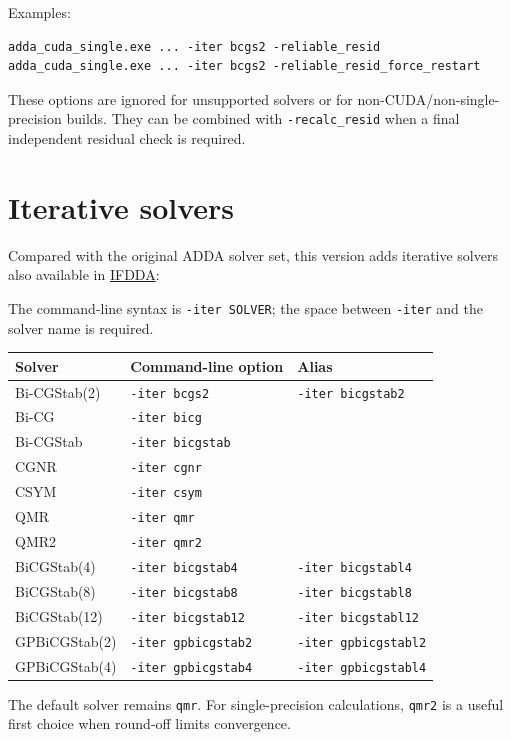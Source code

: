 \documentclass[11pt,a4paper]{article}
\newcommand{\code}[1]{\nolinkurl{#1}}
\newcommand{\itercmd}[1]{\texttt{-iter #1}}
\begin{document}
Examples:

\begin{lstlisting}
adda_cuda_single.exe ... -iter bcgs2 -reliable_resid
adda_cuda_single.exe ... -iter bcgs2 -reliable_resid_force_restart
\end{lstlisting}

These options are ignored for unsupported solvers or for
non-CUDA/non-single-precision builds. They can be combined with
\code{-recalc_resid} when a final independent residual check is required.

\section{Iterative solvers}

Compared with the original ADDA solver set, this version adds iterative
solvers also available in
\href{https://www.fresnel.fr/perso/chaumet/ifdda.html}{IFDDA}:

The command-line syntax is \texttt{-iter SOLVER}; the space between
\texttt{-iter} and the solver name is required.

\begin{longtable}{@{}L{0.31\textwidth}L{0.31\textwidth}L{0.28\textwidth}@{}}
\toprule
\textbf{Solver} & \textbf{Command-line option} & \textbf{Alias} \\
\midrule
\endhead
Bi-CGStab(2) & \itercmd{bcgs2} & \itercmd{bicgstab2} \\
Bi-CG & \itercmd{bicg} & \\
Bi-CGStab & \itercmd{bicgstab} & \\
CGNR & \itercmd{cgnr} & \\
CSYM & \itercmd{csym} & \\
QMR & \itercmd{qmr} & \\
QMR2 & \itercmd{qmr2} & \\
BiCGStab(4) & \itercmd{bicgstab4} & \itercmd{bicgstabl4} \\
BiCGStab(8) & \itercmd{bicgstab8} & \itercmd{bicgstabl8} \\
BiCGStab(12) & \itercmd{bicgstab12} & \itercmd{bicgstabl12} \\
GPBiCGStab(2) & \itercmd{gpbicgstab2} & \itercmd{gpbicgstabl2} \\
GPBiCGStab(4) & \itercmd{gpbicgstab4} & \itercmd{gpbicgstabl4} \\
\bottomrule
\end{longtable}

The default solver remains \code{qmr}. For single-precision calculations,
\code{qmr2} is a useful first choice when round-off limits convergence.
\end{document}
